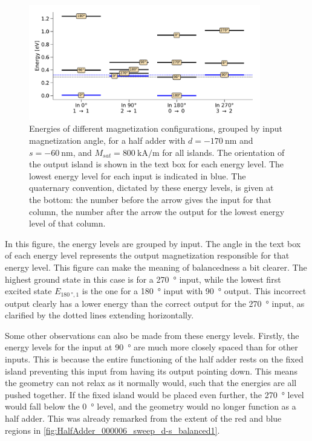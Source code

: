 \documentclass[11pt,a4paper,english]{article}
\begin{document}
\begin{figure}
    \centering
    \includegraphics[width=0.9\textwidth]{Figures/half_adder/energylevels/table(d170,s-60)_energylevels.pdf}
    \caption{Energies of different magnetization configurations, grouped by input magnetization angle, for a half adder with $d=\SI{-170}{\nano\metre}$ and $s=\SI{-60}{\nano\metre}$, and $M_{sat} = \SI{800}{\kilo\ampere\per\metre}$ for all islands. The orientation of the output island is shown in the text box for each energy level. The lowest energy level for each input is indicated in blue. The quaternary convention, dictated by these energy levels, is given at the bottom: the number before the arrow gives the input for that column, the number after the arrow the output for the lowest energy level of that column.}
    \label{fig:HalfAdder_000006_energylevels_d170_s-60}
\end{figure}
In this figure, the energy levels are grouped by input. The angle in the text box of each energy level represents the output magnetization responsible for that energy level. This figure can make the meaning of balancedness a bit clearer. The highest ground state in this case is for a \SI{270}{\degree} input, while the lowest first excited state $E_{\SI{180}{\degree}, 1}$ is the one for a \SI{180}{\degree} input with \SI{90}{\degree} output. This incorrect output clearly has a lower energy than the correct output for the \SI{270}{\degree} input, as clarified by the dotted lines extending horizontally. \par
Some other observations can also be made from these energy levels. Firstly, the energy levels for the input at \SI{90}{\degree} are much more closely spaced than for other inputs. This is because the entire functioning of the half adder rests on the fixed island preventing this input from having its output pointing down. This means the geometry can not relax as it normally would, such that the energies are all pushed together. If the fixed island would be placed even further, the \SI{270}{\degree} level would fall below the \SI{0}{\degree} level, and the geometry would no longer function as a half adder. This was already remarked from the extent of the red and blue regions in \cref{fig:HalfAdder_000006_sweep_d-s_balanced1}.
\end{document}
